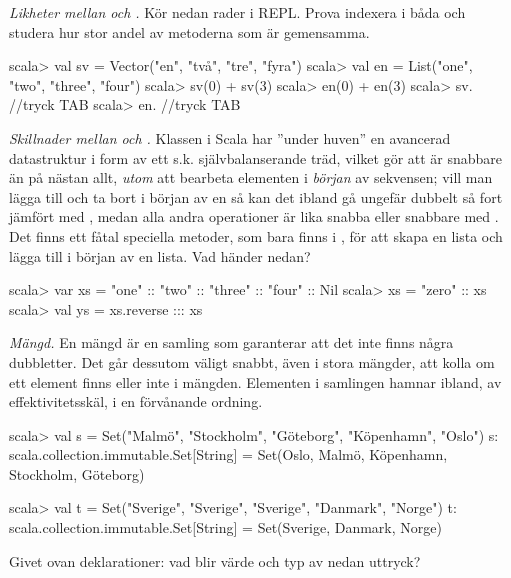 {{\Subtask \emph{Likheter mellan  och .} Kör nedan rader i REPL. Prova indexera i båda och studera hur stor andel av metoderna som är gemensamma.
\begin{REPL}
scala> val sv = Vector("en", "två", "tre", "fyra")
scala> val en = List("one", "two", "three", "four")
scala> sv(0) + sv(3)
scala> en(0) + en(3)
scala> sv. //tryck TAB 
scala> en. //tryck TAB
\end{REPL}

\Subtask \emph{Skillnader mellan  och .} Klassen  i Scala har ''under huven'' en avancerad datastruktur i form av ett s.k. självbalanserande träd, vilket gör att  är snabbare än  på nästan allt, \emph{utom} att bearbeta elementen i \emph{början} av sekvensen; vill man lägga till och ta bort i början av en  så kan det ibland gå ungefär dubbelt så fort jämfört med , medan alla andra operationer är lika snabba eller snabbare med . Det finns ett fåtal speciella metoder, som bara finns i , för att skapa en lista och lägga till i början av en lista. Vad händer nedan?

\begin{REPL}
scala> var xs = "one" :: "two" :: "three" :: "four" :: Nil
scala> xs = "zero" :: xs
scala> val ys = xs.reverse ::: xs
\end{REPL}


\Task \emph{Mängd.} En mängd är en samling som garanterar att det inte finns några dubbletter. Det går dessutom väligt snabbt, även i stora mängder, att kolla om ett element finns eller inte i mängden. Elementen i samlingen  hamnar ibland, av effektivitetsskäl, i en förvånande ordning.
\begin{REPL}
scala> val s = Set("Malmö", "Stockholm", "Göteborg", "Köpenhamn", "Oslo")
s: scala.collection.immutable.Set[String] = 
     Set(Oslo, Malmö, Köpenhamn, Stockholm, Göteborg)

scala> val t = Set("Sverige", "Sverige", "Sverige", "Danmark", "Norge")
t: scala.collection.immutable.Set[String] = Set(Sverige, Danmark, Norge)
\end{REPL}
Givet ovan deklarationer: vad blir värde och typ av nedan uttryck?

\Subtask {}

\Subtask {}

\Subtask {}

\Subtask {}

}}
